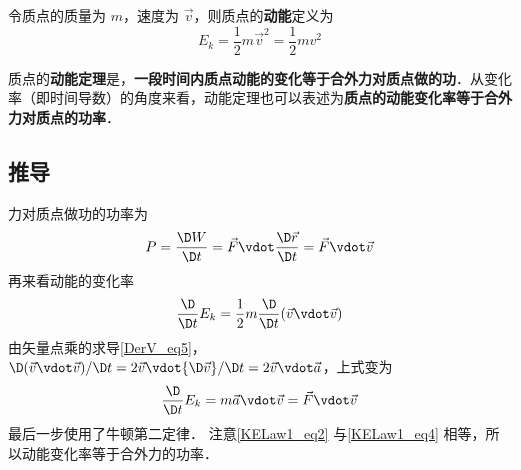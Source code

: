 

令质点的质量为 $m$，速度为 $\vec v$，则质点的\textbf{动能}定义为
\begin{equation}
E_k = \frac 12 m\vec v^2 = \frac 12 mv^2
\end{equation}

质点的\textbf{动能定理}是，\textbf{一段时间内质点动能的变化等于合外力对质点做的功}．从变化率（即时间导数）的角度来看，动能定理也可以表述为\textbf{质点的动能变化率等于合外力对质点的功率}．

\subsection{推导}
力对质点做功的功率为
\begin{equation}\label{KELaw1_eq2}
P = \frac{\D W}{\D t} =  \vec F\vdot\frac{\D\vec r}{\D t} = \vec F\vdot\vec v
\end{equation}
再来看动能的变化率
\begin{equation}
\frac{\D}{\D t} E_k = \frac 12 m\frac{\D}{\D t} (\vec v\vdot\vec v)
\end{equation}
由矢量点乘的求导\autoref{DerV_eq5}，${\D}(\vec v\vdot\vec v)/{\D t} = 2\vec v\vdot{\D\vec v}/{\D t} = 2\vec v\vdot\vec a$，上式变为
\begin{equation}\label{KELaw1_eq4}
\frac{\D}{\D t} E_k = m\vec a\vdot\vec v = \vec F\vdot\vec v
\end{equation}
最后一步使用了牛顿第二定律．%
注意\autoref{KELaw1_eq2} 与\autoref{KELaw1_eq4} 相等，所以动能变化率等于合外力的功率．